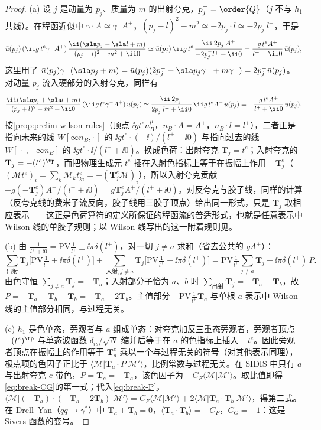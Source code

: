 \begin{proof}
(a) 设 $j$ 是动量为 $p_j$、质量为 $m$ 的出射夸克，$p_j^-=\order{Q}$（$j$ 不与 $h_1$ 共线）。在程函近似中 $\gamma\cdot A\simeq\gamma^-A^+$，$(p_j-l)^2-m^2\simeq-2p_j\cdot l\simeq-2p_j^-l^+$，于是
\[
\bar u(p_j)\,(\ii g\,t^e\gamma^-A^+)\,\frac{\ii(\sla p_j-\sla l+m)}{(p_j-l)^2-m^2+\ii0}\simeq
\bar u(p_j)\,\ii g\,t^e\,\frac{\ii\,2p_j^-A^+}{-2p_j^-l^++\ii0}=\frac{g\,t^e A^+}{l^+-\ii0}\,\bar u(p_j),
\]
这里用了 $\bar u(p_j)\gamma^-(\sla p_j+m)=\bar u(p_j)(2p_j^--\sla p_j\gamma^-+m\gamma^-)=2p_j^-\bar u(p_j)$。对动量 $p_j$ 流入硬部分的入射夸克，同样有
\[
\frac{\ii(\sla p_j+\sla l+m)}{(p_j+l)^2-m^2+\ii0}\,(\ii g\,t^e\gamma^-A^+)\,u(p_j)\simeq\frac{\ii\,2p_j^-}{2p_j^-l^++\ii0}\,\ii g\,t^eA^+\,u(p_j)=-\frac{g\,t^eA^+}{l^++\ii0}\,u(p_j).
\]
按\cref{prop:prelim-wilson-rules}（顶点 $\ii gt^en_B^\mu$，$n_B\cdot A=A^+$，$n_B\cdot l=l^+$），二者正是指向未来的线 $W[\infty n_B,\cdot\,]$ 的 $\ii gt^e\cdot(-\ii)/(l^+-\ii0)$ 与指向过去的线 $W[\,\cdot\,,-\infty n_B]$ 的 $\ii gt^e\cdot\ii/(l^++\ii0)$。换成色荷：出射夸克 $\mathbf T_j=t^e$；入射夸克的 $\mathbf T_j=-(t^e)^{\tp}$，而把物理生成元 $t^e$ 插在入射色指标上等于在振幅上作用 $-\mathbf T_j^e$（$(\mathcal Mt^e)_i=\sum_k\mathcal M_kt^e_{ki}=-(\mathbf T_j^e\mathcal M)_i$），所以入射夸克贡献 $-g(-\mathbf T_j^e)A^+/(l^++\ii0)=g\mathbf T_j^eA^+/(l^++\ii0)$。对反夸克与胶子线，同样的计算（反夸克线的费米子流反向，胶子线用三胶子顶点）给出同一形式，只是 $\mathbf T_j$ 取相应表示——这正是色荷算符的定义所保证的程函流的普适形式\cite{CataniSeymour1997}，也就是任意表示中 Wilson 线的单胶子规则；以 Wilson 线写出的这一附着规则见\cite{Buffing:2011mj}。

(b) 由 $\frac{1}{l^+\mp\ii0}=\mathrm{PV}\frac1{l^+}\pm\ii\pi\delta(l^+)$，对一切 $j\neq a$ 求和（省去公共的 $gA^+$）：
\[
\sum_{\text{出射}}\mathbf T_j\Big[\mathrm{PV}\tfrac1{l^+}+\ii\pi\delta(l^+)\Big]+\sum_{\text{入射},j\neq a}\mathbf T_j\Big[\mathrm{PV}\tfrac1{l^+}-\ii\pi\delta(l^+)\Big]
=\mathrm{PV}\tfrac1{l^+}\sum_{j\neq a}\mathbf T_j+\ii\pi\delta(l^+)\,P .
\]
由色守恒 $\sum_{j\neq a}\mathbf T_j=-\mathbf T_a$；入射部分子恰为 $a$、$b$ 时 $\sum_{\text{出射}}\mathbf T_j=-\mathbf T_a-\mathbf T_b$，故 $P=-\mathbf T_a-\mathbf T_b-\mathbf T_b=-\mathbf T_a-2\mathbf T_b$。主值部分 $-\mathrm{PV}\frac1{l^+}\mathbf T_a$ 与单根 $a$ 表示中 Wilson 线的主值部分相同，与过程无关。

(c) $h_1$ 是色单态，旁观者与 $a$ 组成单态：对夸克加反三重态旁观者，旁观者顶点 $-(t^e)^{\tp}$ 与单态波函数 $\delta_{is}/\sqrt N$ 缩并后等于在 $a$ 的色指标上插入 $-t^e$。因此旁观者顶点在振幅上的作用等于 $\mathbf T_a^e$ 乘以一个与过程无关的符号（对其他表示同理），极点项的色因子正比于 $\langle\mathcal M|\mathbf T_a\cdot P|\mathcal M'\rangle$，比例常数与过程无关。在 SIDIS 中只有 $a$ 与出射夸克 $c$ 带色，$P=\mathbf T_c=-\mathbf T_a$，该色因子为 $-C_F\langle\mathcal M|\mathcal M'\rangle$。取比值即得\cref{eq:break-CG}的第一式；代入\cref{eq:break-P}，$\langle\mathcal M|(-\mathbf T_a)\cdot(-\mathbf T_a-2\mathbf T_b)|\mathcal M'\rangle=C_F\langle\mathcal M|\mathcal M'\rangle+2\langle\mathcal M|\mathbf T_a\cdot\mathbf T_b|\mathcal M'\rangle$，得第二式。在 Drell--Yan（$q\bar q\to\gamma^*$）中 $\mathbf T_a+\mathbf T_b=0$，$\langle\mathbf T_a\cdot\mathbf T_b\rangle=-C_F$，$C_G=-1$：这是 Sivers 函数的变号。


\end{proof}
